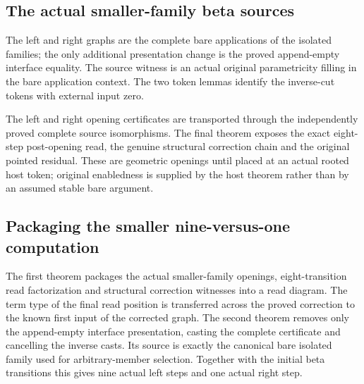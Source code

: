 \subsection{The actual smaller-family beta sources}
The left and right graphs are the complete bare applications of the isolated families; the only additional presentation change is the proved append-empty interface equality. The source witness is an actual original parametricity filling in the bare application context. The two token lemmas identify the inverse-cut tokens with external input zero.

The left and right opening certificates are transported through the independently proved complete source isomorphisms. The final theorem exposes the exact eight-step post-opening read, the genuine structural correction chain and the original pointed residual. These are geometric openings until placed at an actual rooted host token; original enabledness is supplied by the host theorem rather than by an assumed stable bare argument.
\par{}
\par{}

\subsection{Packaging the smaller nine-versus-one computation}
The first theorem packages the actual smaller-family openings, eight-transition read factorization and structural correction witnesses into a read diagram. The term type of the final read position is transferred across the proved correction to the known first input of the corrected graph. The second theorem removes only the append-empty interface presentation, casting the complete certificate and cancelling the inverse casts. Its source is exactly the canonical bare isolated family used for arbitrary-member selection. Together with the initial beta transitions this gives nine actual left steps and one actual right step.
\par{}

